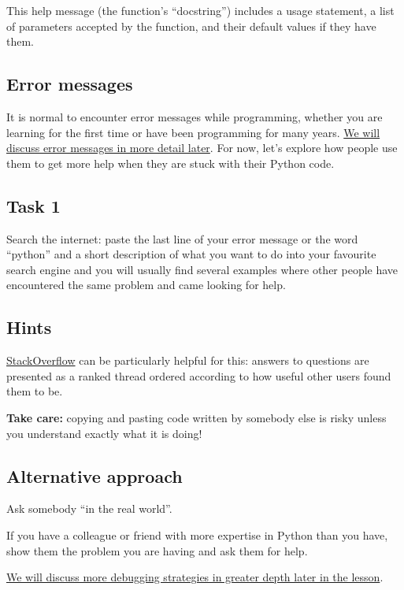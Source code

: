 \documentclass[
  letterpaper,
  DIV=11,
  numbers=noendperiod]{scrartcl}
\begin{document}
This help message (the function's ``docstring'') includes a usage
statement, a list of parameters accepted by the function, and their
default values if they have them.

\subsection{Error messages}\label{error-messages}

It is normal to encounter error messages while programming, whether you
are learning for the first time or have been programming for many years.
\href{./09-errors.md}{We will discuss error messages in more detail
later}. For now, let's explore how people use them to get more help when
they are stuck with their Python code.

\subsection{Task 1}\label{task-1}

Search the internet: paste the last line of your error message or the
word ``python'' and a short description of what you want to do into your
favourite search engine and you will usually find several examples where
other people have encountered the same problem and came looking for
help.

\subsection{Hints}\label{hints}

\href{https://stackoverflow.com/questions}{StackOverflow} can be
particularly helpful for this: answers to questions are presented as a
ranked thread ordered according to how useful other users found them to
be.

\textbf{Take care:} copying and pasting code written by somebody else is
risky unless you understand exactly what it is doing!

\subsection{Alternative approach}\label{alternative-approach}

Ask somebody ``in the real world''.

If you have a colleague or friend with more expertise in Python than you
have, show them the problem you are having and ask them for help.

\href{./11-debugging.md}{We will discuss more debugging strategies in
greater depth later in the lesson}.
\end{document}
